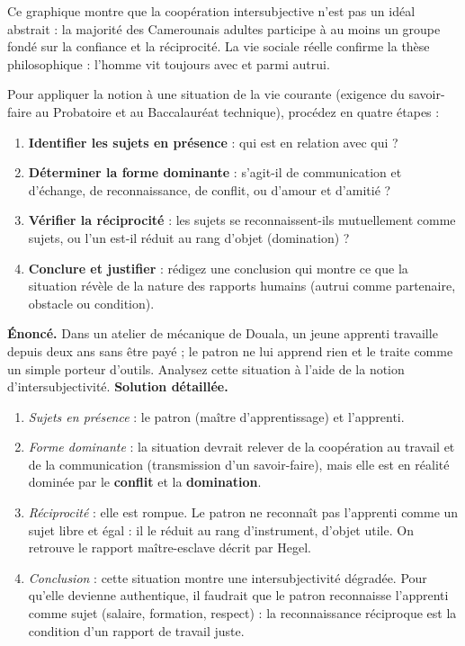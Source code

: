 \documentclass[11pt]{article}
\newcounter{popsec}
\newcounter{popsub}
\newcommand{\courssub}[1]{%
  \stepcounter{popsub}%
  \par\vspace{9pt}\noindent{\popxbold\fontsize{11.5}{13}\selectfont\color{popink}{\color{poporange}\thepopsec.\thepopsub}\hspace{6pt}#1}\par\nopagebreak\vspace{4pt}
}
\begin{document}
Ce graphique montre que la coopération intersubjective n'est pas un idéal abstrait : la majorité des Camerounais adultes participe à au moins un groupe fondé sur la confiance et la réciprocité. La vie sociale réelle confirme la thèse philosophique : l'homme vit toujours avec et parmi autrui.

\courssub{Méthode et entraînement}

\begin{methode}
Pour appliquer la notion à une situation de la vie courante (exigence du savoir-faire au Probatoire et au Baccalauréat technique), procédez en quatre étapes :
\begin{enumerate}
\item \textbf{Identifier les sujets en présence} : qui est en relation avec qui ?
\item \textbf{Déterminer la forme dominante} : s'agit-il de communication et d'échange, de reconnaissance, de conflit, ou d'amour et d'amitié ?
\item \textbf{Vérifier la réciprocité} : les sujets se reconnaissent-ils mutuellement comme sujets, ou l'un est-il réduit au rang d'objet (domination) ?
\item \textbf{Conclure et justifier} : rédigez une conclusion qui montre ce que la situation révèle de la nature des rapports humains (autrui comme partenaire, obstacle ou condition).
\end{enumerate}
\end{methode}

\begin{exoresolu}
\textbf{Énoncé.} Dans un atelier de mécanique de Douala, un jeune apprenti travaille depuis deux ans sans être payé ; le patron ne lui apprend rien et le traite comme un simple porteur d'outils. Analysez cette situation à l'aide de la notion d'intersubjectivité.
\tcblower
\textbf{Solution détaillée.}
\begin{enumerate}
\item \emph{Sujets en présence} : le patron (maître d'apprentissage) et l'apprenti.
\item \emph{Forme dominante} : la situation devrait relever de la coopération au travail et de la communication (transmission d'un savoir-faire), mais elle est en réalité dominée par le \textbf{conflit} et la \textbf{domination}.
\item \emph{Réciprocité} : elle est rompue. Le patron ne reconnaît pas l'apprenti comme un sujet libre et égal : il le réduit au rang d'instrument, d'objet utile. On retrouve le rapport maître-esclave décrit par Hegel.
\item \emph{Conclusion} : cette situation montre une intersubjectivité dégradée. Pour qu'elle devienne authentique, il faudrait que le patron reconnaisse l'apprenti comme sujet (salaire, formation, respect) : la reconnaissance réciproque est la condition d'un rapport de travail juste.
\end{enumerate}
\end{exoresolu}
\end{document}

